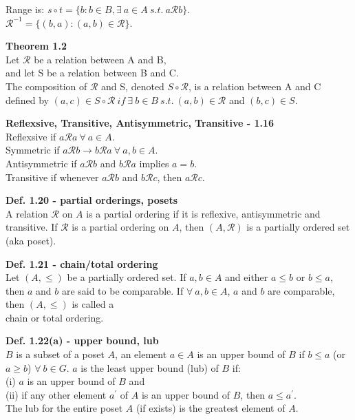 \documentclass{article}
\begin{document}
Range is: $s \circ t = \{b : b \in B, \exists \ a \in A \ s.t. \ a\mathcal{R}b \}$.\\

$\mathcal{R}^{-1} = \{(b,a) : (a,b) \in \mathcal{R} \}$.
\newline

\textbf{Theorem 1.2}\\
Let $\mathcal{R}$ be a relation between A and B,\\and let S be a relation between B and C.\\
The composition of $\mathcal{R}$ and S, denoted $S \circ \mathcal{R}$, is a relation between
A and C defined by $(a,c) \in S \circ \mathcal{R} \ if \  \exists \ b \in B \ s.t. \ (a,b) \in \mathcal{R}$ and $(b,c) \in S$.

\textbf{Reflexsive, Transitive, Antisymmetric, Transitive - 1.16}\\
Reflexsive if $a\mathcal{R}a \ \forall \ a \in A$.\\
Symmetric if $a\mathcal{R}b \to b\mathcal{R}a \ \forall \ a,b \in A $.\\
Antisymmetric if $a\mathcal{R}b$ and $b\mathcal{R}a$ implies $a=b$.\\
Transitive if whenever $a\mathcal{R}b$ and $b\mathcal{R}c$, then $a\mathcal{R}c$.
\newpage %

\textbf{Def. 1.20 - partial orderings, posets}\\
A relation $\mathcal{R}$ on $A$ is a partial ordering if it is reflexive, antisymmetric and transitive.
If $\mathcal{R}$ is a partial ordering on $A$, then $(A,\mathcal{R})$ is a partially ordered set (aka poset).
\newline

\textbf{Def. 1.21 - chain/total ordering}\\
Let $(A, \le)$ be a partially ordered set.  If $a,b \in A$ and either $a \le b$ or $b \le a$, then $a$ and $b$ are said to be comparable.  If $\forall \ a,b \in A$, $a$ and $b$ are comparable, then $(A, \le)$ is called a 
\\ chain or total ordering.
\newline

\textbf{Def. 1.22(a) - upper bound, lub}\\
$B$ is a subset of a poset $A$, an element $a \in A$ is an upper bound of $B$ if $b \le a$ (or $a \ge b$) $\forall \ b \in G$. $a$ is the least upper bound (lub) of $B$ if:\\
(i) $a$ is an upper bound of $B$ and\\
(ii) if any other element $a^{'}$ of $A$ is an upper bound of $B$, then $a \le a^{'}$.\\
The lub for the entire poset $A$ (if exists) is the greatest element of $A$.
\newline
\end{document}
